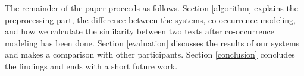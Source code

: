 \documentclass[11pt]{article}
\begin{document}
The remainder of the paper proceeds as follows. Section \ref{algorithm} explains the preprocessing part, the difference between the systems, co-occurrence modeling, and how we calculate the similarity between two texts after co-occurrence modeling has been done. Section \ref{evaluation} discusses the results of our systems and makes a comparison with other participants. Section \ref{conclusion} concludes the findings and ends with a short future work.




\end{document}

